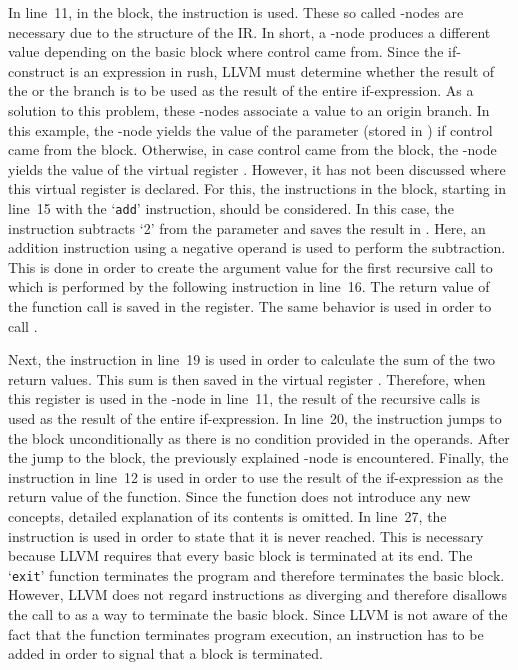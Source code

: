 In line~11, in the  block, the  instruction is used.
These so called \phi-nodes are necessary due to the structure of the IR\@.
In short, a \phi-node produces a different value depending on the basic block where control came from.
Since the if-construct is an expression in rush, LLVM must determine whether the result of the  or the  branch is to be used as the result of the entire if-expression.
As a solution to this problem, these \phi-nodes associate a value to an origin branch.
In this example, the \phi-node yields the value of the parameter  (stored in ) if control came from the  block.
Otherwise, in case control came from the  block, the \phi-node yields the value of the virtual register .
However, it has not been discussed where this virtual register is declared.
For this, the instructions in the  block, starting in line~15 with the `\texttt{add}' instruction, should be considered.
In this case, the instruction subtracts `2' from the parameter  and saves the result in .
Here, an addition instruction using a negative operand is used to perform the subtraction.
This is done in order to create the argument value for the first recursive call to  which is performed by the following  instruction in line~16.
The return value of the function call is saved in the  register.
The same behavior is used in order to call .

Next, the  instruction in line~19 is used in order to calculate the sum of the two return values.
This sum is then saved in the virtual register .
Therefore, when this register is used in the \phi-node in line~11, the result of the recursive calls is used as the result of the entire if-expression.
In line~20, the  instruction jumps to the  block unconditionally as there is no condition provided in the operands.
After the jump to the  block, the previously explained \phi-node is encountered.
Finally, the  instruction in line~12 is used in order to use the result of the if-expression as the return value of the function.
Since the  function does not introduce any new concepts, detailed explanation of its contents is omitted.
In line~27, the  instruction is used in order to state that it is never reached.
This is necessary because LLVM requires that every basic block is terminated at its end.
The `\texttt{exit}' function terminates the program and therefore terminates the basic block.
However, LLVM does not regard  instructions as diverging and therefore disallows the call to  as a way to terminate the basic block.
Since LLVM is not aware of the fact that the  function terminates program execution,
an  instruction has to be added in order to signal that a block is terminated.


